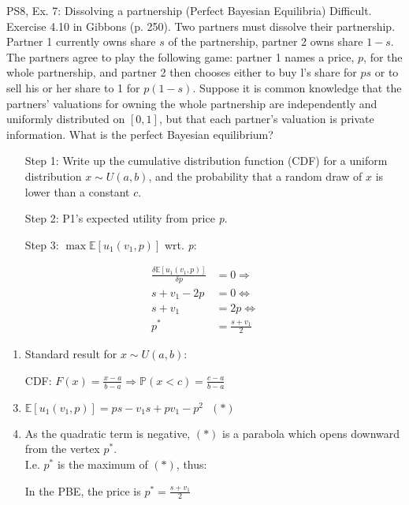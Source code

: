 \begin{frame}{PS8, Ex. 7: Dissolving a partnership (Perfect Bayesian Equilibria)}
    Difficult. Exercise 4.10 in Gibbons (p. 250). Two partners must dissolve their partnership. Partner 1 currently owns share $s$ of the partnership, partner 2 owns share $1-s$. The partners agree to play the following game: partner 1 names a price, $p$, for the whole partnership, and partner 2 then chooses either to buy l's share for $ps$ or to sell his or her share to 1 for $p(1-s)$. Suppose it is common knowledge that the partners' valuations for owning the whole partnership are independently and uniformly distributed on $[0,1]$, but that each partner's valuation is private information. What is the perfect Bayesian equilibrium?\vspace{-11pt}
    \begin{multicols}{2}
      \begin{itemize}
        \item[Step 1:] Write up the cumulative distribution function (CDF) for a uniform distribution $x\sim U(a, b)$, and the probability that a random draw of $x$ is lower than a constant $c$.
        \item[Step 2:] P1's expected utility from price \textit{p}.
        \item[Step 3:] $\max\mathbb{E}[u_1(v_1,p)]$ wrt. \textit{p}:
      \end{itemize}\vspace{-6pt}
      \begin{align*}
        \frac{\delta \mathbb{E}[u_1(v_1,p)]}{\delta p}&=0\Rightarrow\\
        s+v_1-2p&=0\Leftrightarrow\\
        s+v_1&=2p\Leftrightarrow\\
        p^*&=\frac{s+v_1}{2}
      \end{align*}
      \vfill\null\columnbreak
      \begin{enumerate}
        \item Standard result for $x\sim U(a, b):$
        \item[CDF:] $F(x)=\frac{x-a}{b-a}\Rightarrow\mathbb{P}(x<c)=\frac{c-a}{b-a}$
        \item $\mathbb{E}[u_1(v_1,p)]=ps-v_1s+pv_1-p^2\ \ \ (*)$
        \item As the quadratic term is negative, $(*)$ is a parabola which opens downward from the vertex $p^*$.\\
        I.e. $p^*$ is the maximum of $(*)$, thus:
        \item[] In the PBE, the price is $p^*=\frac{s+v_1}{2}$
      \end{enumerate}
      \vfill\null
    \end{multicols}
\end{frame}
